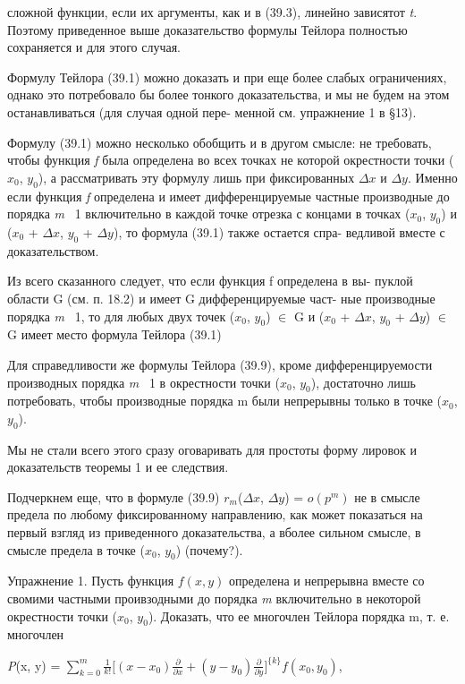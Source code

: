\documentclass{article}
\begin{document}
	 сложной функции, если их аргументы, как и в (39.3),
	линейно зависятот \textit {t}. Поэтому приведенное выше доказательство
	формулы Тейлора полностью сохраняется и для этого случая.
	 
	Формулу Тейлора (39.1) можно доказать и при еще более слабых
	ограничениях, однако это потребовало бы более тонкого доказательства,
	 и мы не будем на этом останавливаться (для случая одной пере-
	менной см. упражнение 1 в \S 13).
	 
	Формулу (39.1) можно несколько обобщить и в другом смысле:
	не требовать, чтобы функция \textit {f} была определена во всех точках не
	которой окрестности точки ($x_0$, $y_0$), а рассматривать эту формулу
	лишь при фиксированных $\Delta x$ и $\Delta y$. Именно если функция \textit {f} определена и имеет дифференцируемые частные производные до порядка 
	\textit {m} \textemdash~1 включительно в каждой точке отрезка с концами в точках 
	($x_0$, $y_0$) и ($x_0$ +  $\Delta x$, $y_0$ + $\Delta y$), то формула (39.1) также остается спра-
	ведливой вместе с доказательством.
	 
	Из всего сказанного следует, что если функция f определена в вы-
	пуклой области G (см. п. 18.2) и имеет G дифференцируемые част-
	ные производные порядка \textit {m} \textemdash~1, то для любых двух точек ($x_0$, $y_0$) $\in$ G 
	и ($x_0$ +  $\Delta x$, $y_0$ + $\Delta y$) $\in$ G имеет место формула Тейлора (39.1)
	 
	Для справедливости же формулы Тейлора (39.9), кроме дифференцируемости производных порядка \textit {m} \textemdash~1 в окрестности точки 
	($x_0$, $y_0$), достаточно лишь потребовать, чтобы производные порядка m
	были непрерывны только в точке ($x_0$, $y_0$).
	 
	Мы не стали всего этого сразу оговаривать для простоты форму
	лировок и доказательств теоремы 1 и ее следствия.
	 
	Подчеркнем еще, что в формуле (39.9) $r_m$($\Delta x$, $\Delta y$) = $o(p^m)$
	не в смысле предела по любому фиксированному направлению, как может показаться
	на первый взгляд из приведенного доказательства, а вболее сильном смысле, в смысле предела
	в точке  ($x_0$, $y_0$) (почему?).

	Упражнение 1. Пусть функция $f(x, y)$ определена и непрерывна вместе со свомими частными проивзодными
	до порядка \textit {m}  включительно в некоторой окрестности точки ($x_0$, $y_0$). Доказать, что 
	ее многочлен Тейлора порядка m, т. е. многочлен


	\textit{P}(x, y) = $\sum\limits_{k = 0}^m \frac{1}{k!} \bigl[(x- x_0) \frac{\partial}{\partial x} +
	 (y- y_0) \frac{\partial}{\partial y}\bigr]^{\{k\}} \textit {f}(x_0, y_0)$,
\end{document}
